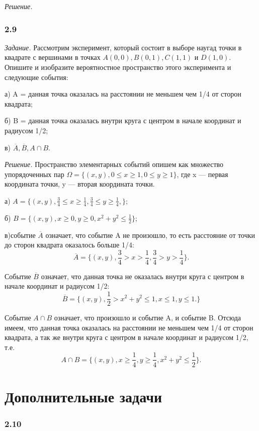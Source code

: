 \documentclass{book}
\begin{document}
\textit{Решение.}

\subsubsection*{2.9}

\textit{Задание.} Рассмотрим эксперимент, который состоит в выборе наугад точки в квадрате с вершинами в точках $A(0, 0), B(0, 1), C(1, 1)$ и $D(1, 0)$. Опишите и изобразите вероятностное пространство этого эксперимента и следующие события:

а) A = {данная точка оказалась на расстоянии не меньшем чем 1/4 от сторон квадрата};

б) B = {данная точка оказалась внутри круга с центром в начале координат и радиусом 1/2};

в) $\overline{A}, \overline{B}, A\cap B$.

\textit{Решение.} Пространство элементарных событий опишем как множество упорядоченных пар $\Omega=\{(x, y), 0\leq x\geq 1, 0\leq y\geq 1\}$, где x --- первая координата точки, y --- вторая координата точки.

а) $A=\{(x, y), \frac{3}{4}\leq x\geq\frac{1}{4}, \frac{3}{4}\leq y\geq\frac{1}{4}, \}$;

б) $B=\{(x, y), x\geq 0, y\geq 0, x^2+y^2\leq\frac{1}{2}\}$;

в)событие $\overline{A}$ означает, что событие A не произошло, то есть расстояние от точки до сторон квадрата оказалось больше 1/4: $$\overline{A}=\{(x, y), \frac{3}{4}>x>\frac{1}{4}, \frac{3}{4}>y>\frac{1}{4}\}.$$

Событие $\overline{B}$ означает, что данная точка не оказалась внутри круга с центром в начале координат и радиусом 1/2: $$\overline{B}=\{(x, y), \frac{1}{2}>x^2+y^2\leq 1, x\leq 1, y\leq 1.\}$$

Событие $A\cap B$ означает, что произошло и событие A, и событие B. Отсюда имеем, что данная точка оказалась на расстоянии не меньшем чем 1/4 от сторон квадрата, а так же внутри круга с центром в начале координат и радиусом 1/2, т.е. $$A\cap B=\{(x, y), x\geq\frac{1}{4}, y\geq\frac{1}{4}, x^2+y^2\leq\frac{1}{2}\}.$$

\section*{Дополнительные задачи}

\subsubsection*{2.10}
\end{document}
